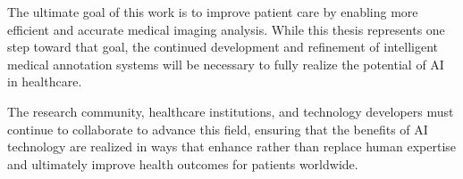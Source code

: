 The ultimate goal of this work is to improve patient care by enabling more efficient and accurate medical imaging analysis. While this thesis represents one step toward that goal, the continued development and refinement of intelligent medical annotation systems will be necessary to fully realize the potential of AI in healthcare.

The research community, healthcare institutions, and technology developers must continue to collaborate to advance this field, ensuring that the benefits of AI technology are realized in ways that enhance rather than replace human expertise and ultimately improve health outcomes for patients worldwide. 